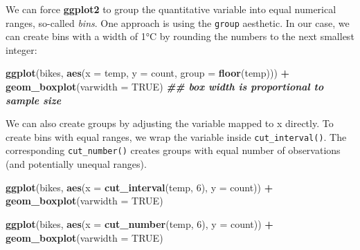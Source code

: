 \documentclass[
]{krantz}
\makeatletter
\newenvironment{Shaded}{\begin{snugshade}}{\end{snugshade}}
\newcommand{\AttributeTok}[1]{\textcolor[rgb]{0.27,0.27,0.27}{#1}}
\newcommand{\ConstantTok}[1]{\textcolor[rgb]{0.37,0.37,0.37}{#1}}
\newcommand{\DecValTok}[1]{\textcolor[rgb]{0.06,0.06,0.06}{#1}}
\newcommand{\DocumentationTok}[1]{\textcolor[rgb]{0.37,0.37,0.37}{\textbf{\textit{#1}}}}
\newcommand{\FunctionTok}[1]{\textcolor[rgb]{0.27,0.27,0.27}{\textbf{#1}}}
\newcommand{\NormalTok}[1]{#1}
\newcommand{\SpecialCharTok}[1]{\textcolor[rgb]{0.43,0.43,0.43}{\textbf{#1}}}
\newenvironment{kframe}{%
\medskip{}
\setlength{\fboxsep}{.8em}
 \def\at@end@of@kframe{}%
 \ifinner\ifhmode%
  \def\at@end@of@kframe{\end{minipage}}%
  \begin{minipage}{\columnwidth}%
 \fi\fi%
 \def\FrameCommand##1{\hskip\@totalleftmargin \hskip-\fboxsep
 \colorbox{shadecolor}{##1}\hskip-\fboxsep
     \hskip-\linewidth \hskip-\@totalleftmargin \hskip\columnwidth}%
 \MakeFramed {\advance\hsize-\width
   \@totalleftmargin\z@ \linewidth\hsize
   \@setminipage}}%
 {\par\unskip\endMakeFramed%
 \at@end@of@kframe}
\renewenvironment{Shaded}{\begin{kframe}}{\end{kframe}}
\makeatother
\begin{document}
We can force \textbf{ggplot2} to group the quantitative variable into equal numerical ranges, so-called \emph{bins}. One approach is using the \texttt{group} aesthetic. In our case, we can create bins with a width of 1°C by rounding the numbers to the next smallest integer:

\begin{Shaded}
\begin{Highlighting}[]
\FunctionTok{ggplot}\NormalTok{(bikes, }\FunctionTok{aes}\NormalTok{(}\AttributeTok{x =}\NormalTok{ temp, }\AttributeTok{y =}\NormalTok{ count, }\AttributeTok{group =} \FunctionTok{floor}\NormalTok{(temp))) }\SpecialCharTok{+} 
  \FunctionTok{geom\_boxplot}\NormalTok{(}\AttributeTok{varwidth =} \ConstantTok{TRUE}\NormalTok{) }\DocumentationTok{\#\# box width is proportional to sample size}
\end{Highlighting}
\end{Shaded}

We can also create groups by adjusting the variable mapped to x directly. To create bins with equal ranges, we wrap the variable inside \texttt{cut\_interval()}. The corresponding \texttt{cut\_number()} creates groups with equal number of observations (and potentially unequal ranges).

\begin{Shaded}
\begin{Highlighting}[]
\FunctionTok{ggplot}\NormalTok{(bikes, }\FunctionTok{aes}\NormalTok{(}\AttributeTok{x =} \FunctionTok{cut\_interval}\NormalTok{(temp, }\DecValTok{6}\NormalTok{), }\AttributeTok{y =}\NormalTok{ count)) }\SpecialCharTok{+} 
  \FunctionTok{geom\_boxplot}\NormalTok{(}\AttributeTok{varwidth =} \ConstantTok{TRUE}\NormalTok{)}

\FunctionTok{ggplot}\NormalTok{(bikes, }\FunctionTok{aes}\NormalTok{(}\AttributeTok{x =} \FunctionTok{cut\_number}\NormalTok{(temp, }\DecValTok{6}\NormalTok{), }\AttributeTok{y =}\NormalTok{ count)) }\SpecialCharTok{+} 
  \FunctionTok{geom\_boxplot}\NormalTok{(}\AttributeTok{varwidth =} \ConstantTok{TRUE}\NormalTok{)}
\end{Highlighting}
\end{Shaded}
\end{document}
